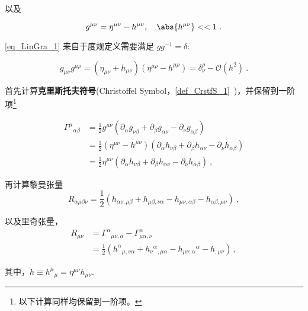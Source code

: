 以及

\begin{equation}\label{eq_LinGra_1}
g^{\mu\nu} = \eta^{\mu\nu} - h^{\mu\nu} , \quad \abs{h^{\mu\nu}}<<1 ~.
\end{equation}

\autoref{eq_LinGra_1} 来自于度规定义需要满足 $gg^{-1}=\delta$:

\begin{equation}
g_{\mu\nu}g^{\mu\rho} = (\eta_{\mu\nu} + h_{\mu\nu})(\eta^{\mu\rho} - h^{\mu\rho}) = \delta^{\rho}_{\nu} - \mathcal{O}(h^2)~.
\end{equation}

首先计算\textbf{克里斯托夫符号}(Christoffel Symbol，\autoref{def_CrstfS_1}~)，并保留到一阶项\footnote{以下计算同样均保留到一阶项。}

\begin{equation}
\begin{aligned}
\Gamma^{\mu}{}_{\alpha\beta}&=\frac{1}{2}g^{\mu\nu}(\partial_\alpha g_{\nu\beta} + \partial_\beta g_{\alpha\nu} - \partial_\nu g_{\alpha\beta})\\
&=\frac{1}{2}(\eta^{\mu\nu} - h^{\mu\nu})(\partial_\alpha h_{\nu\beta} + \partial_\beta h_{\alpha\nu} - \partial_\nu h_{\alpha\beta})\\
&=\frac{1}{2}\eta^{\mu\nu} (\partial_\alpha h_{\nu\beta} + \partial_\beta h_{\alpha\nu} - \partial_\nu h_{\alpha\beta})~,
\end{aligned}
\end{equation}



再计算黎曼张量
\begin{equation}
R_{\alpha \mu \beta \nu}=\frac{1}{2}\left(h_{\alpha \nu, \mu \beta}+h_{\mu \beta, \nu \alpha}-h_{\mu \nu, \alpha \beta}-h_{\alpha \beta, \mu \nu}\right)~,
\end{equation}


以及里奇张量，
\begin{equation}
\begin{aligned}
R_{\mu\nu} &= \Gamma^{\alpha}{}_{\mu\nu,\alpha} - \Gamma^{\alpha}_{\mu\alpha,\nu}\\
&=\frac{1}{2}\left(h^{\alpha}{}_{\mu, \nu \alpha} + h_{\nu}{ }^{\alpha}{ }_{, \mu \alpha}-h_{\mu \nu, \alpha}{ }^{\alpha}-h_{, \mu \nu}\right)~,
\end{aligned}
\end{equation}


其中，$h\equiv h^{\mu}{}_{\mu}=\eta^{\mu\nu}h_{\mu\nu}$.

